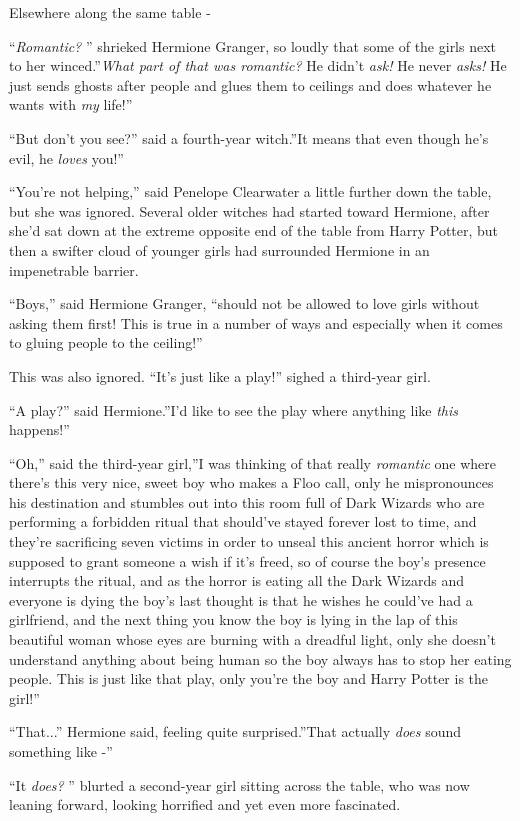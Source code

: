Elsewhere along the same table -

``\emph{Romantic?} '' shrieked Hermione Granger, so loudly that some of
the girls next to her winced.''\emph{What part of that was romantic?} He
didn't \emph{ask!} He never \emph{asks!} He just sends ghosts after
people and glues them to ceilings and does whatever he wants with
\emph{my} life!''

``But don't you see?'' said a fourth-year witch.''It means that even
though he's evil, he \emph{loves} you!''

``You're not helping,'' said Penelope Clearwater a little further down
the table, but she was ignored. Several older witches had started toward
Hermione, after she'd sat down at the extreme opposite end of the table
from Harry Potter, but then a swifter cloud of younger girls had
surrounded Hermione in an impenetrable barrier.

``Boys,'' said Hermione Granger, ``should not be allowed to love girls
without asking them first! This is true in a number of ways and
especially when it comes to gluing people to the ceiling!''

This was also ignored. ``It's just like a play!'' sighed a third-year
girl.

``A play?'' said Hermione.''I'd like to see the play where anything like
\emph{this} happens!''

``Oh,'' said the third-year girl,''I was thinking of that really
\emph{romantic} one where there's this very nice, sweet boy who makes a
Floo call, only he mispronounces his destination and stumbles out into
this room full of Dark Wizards who are performing a forbidden ritual
that should've stayed forever lost to time, and they're sacrificing
seven victims in order to unseal this ancient horror which is supposed
to grant someone a wish if it's freed, so of course the boy's presence
interrupts the ritual, and as the horror is eating all the Dark Wizards
and everyone is dying the boy's last thought is that he wishes he
could've had a girlfriend, and the next thing you know the boy is lying
in the lap of this beautiful woman whose eyes are burning with a
dreadful light, only she doesn't understand anything about being human
so the boy always has to stop her eating people. This is just like that
play, only you're the boy and Harry Potter is the girl!''

``That...'' Hermione said, feeling quite surprised.''That actually
\emph{does} sound something like -''

``It \emph{does?} '' blurted a second-year girl sitting across the table,
who was now leaning forward, looking horrified and yet even more
fascinated.

